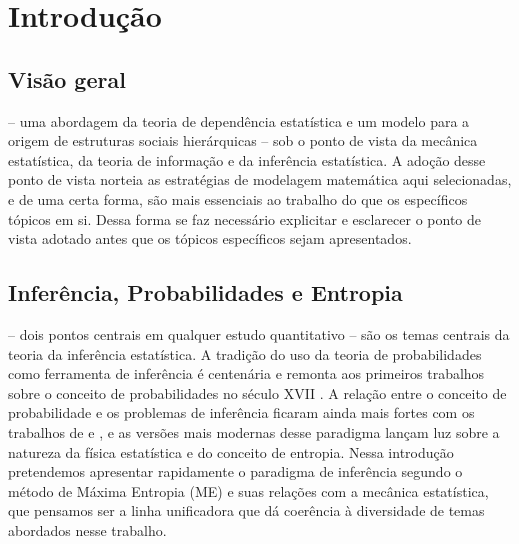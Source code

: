 \chapter{Introdução}

\section{Visão geral}
 -- uma abordagem da teoria de dependência estatística e um modelo para a origem de estruturas sociais hierárquicas -- sob o ponto de vista da mecânica estatística, da teoria de informação e da inferência estatística. A adoção desse ponto de vista norteia as estratégias de modelagem matemática aqui selecionadas, e de uma certa forma, são mais essenciais ao trabalho do que os específicos tópicos em si. Dessa forma se faz necessário explicitar e esclarecer o ponto de vista adotado antes que os tópicos específicos sejam apresentados. 

\section{Inferência, Probabilidades e Entropia}
\label{sec:inferencia}

 -- dois pontos centrais em qualquer estudo quantitativo -- são os temas centrais da teoria da inferência estatística. A tradição do uso da teoria de probabilidades como ferramenta de inferência é centenária e remonta aos primeiros trabalhos sobre o conceito de probabilidades no século XVII \sourcesneeded. A relação entre o conceito de probabilidade e os problemas de inferência ficaram ainda mais fortes com os trabalhos de \citeauthor{Cox1946}\cite[-9cm]{Cox1946,Cox1961} e \citeauthor{Shannon1948}\cite[-5.75cm]{Shannon1948}, e as versões mais modernas desse paradigma\cite[-5cm]{Jaynes2003,ACaticha2008,ACaticha2009} lançam luz sobre a natureza da física estatística e do conceito de entropia. Nessa introdução pretendemos apresentar rapidamente o paradigma de inferência segundo o método de Máxima Entropia (ME) e suas relações com a mecânica estatística, que pensamos ser a linha unificadora que dá coerência à diversidade de temas abordados nesse trabalho. 

